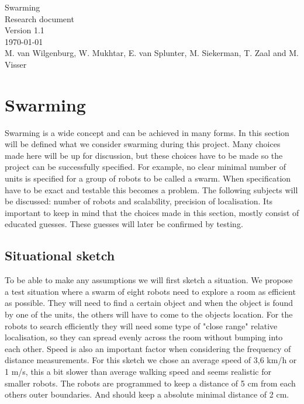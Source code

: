 \documentclass[10pt,a4paper]{article}
\begin{document}
\begin{titlepage}
    \centering
    \vfill
    {\Large

    Swarming\\

   
    {\small Research document}\\
    {\small Version 1.1}\\
    {\small \today}\\
        
        \vskip2cm
        {\small M. van Wilgenburg, W. Mukhtar, E. van Splunter, M. Siekerman, T. Zaal and M. Visser}\\
    }    
    \vfill
    
    \vfill
    \vfill
\end{titlepage}

\newpage

\listoffigures
\newpage

\listoftables
\newpage

\tableofcontents
\newpage

\section{Swarming}
Swarming is a wide concept and can be achieved in many forms. In this section will be defined what we consider swarming during this project. Many choices made here will be up for discussion, but these choices have to be made so the project can be successfully specified. For example, no clear minimal number of units is specified for a group of robots to be called a swarm. When specification have to be exact and testable this becomes a problem. The following subjects will be discussed: number of robots and scalability, precision of localisation. Its important to keep in mind that the choices made in this section, mostly consist of educated guesses. These guesses will later be confirmed by testing.

\subsection{Situational sketch}
To be able to make any assumptions we will first sketch a situation. We propose a test situation where a swarm of eight robots need to explore a room as efficient as possible. They will need to find a certain object and when the object is found by one of the units, the others will have to come to the objects location. For the robots to search efficiently they will need some type of "close range" relative localisation, so they can spread evenly across the room without bumping into each other. Speed is also an important factor when considering the frequency of distance measurements. For this sketch we chose an average speed of 3,6 km/h or 1 m/s, this a bit slower than average walking speed and seems realistic for smaller robots. The robots are programmed to keep a distance of 5 cm from each others outer boundaries. And should keep a absolute minimal distance of 2 cm.
\end{document}
